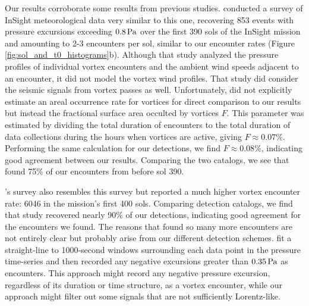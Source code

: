 \documentclass[linenumbers,trackchanges]{aastex63}
\begin{document}
Our results corroborate some results from previous studies. \citet{2021Icar..35514119L} conducted a survey of InSight meteorological data very similar to this one, recovering 853 events with pressure excursions exceeding $0.8\,{\rm Pa}$ over the first 390 sols of the InSight mission and amounting to 2-3 encounters per sol, similar to our encounter rates (Figure \ref{fig:sol_and_t0_histograms}b). Although that study analyzed the pressure profiles of individual vortex encounters and the ambient wind speeds adjacent to an encounter, it did not model the vortex wind profiles. That study did consider the seismic signals from vortex passes as well. Unfortunately, \citet{2021Icar..35514119L} did not explicitly estimate an areal occurrence rate for vortices for direct comparison to our results but instead the fractional surface area occulted by vortices $F$. This parameter was estimated by dividing the total duration of encounters to the total duration of data collections during the hours when vortices are active, giving $F \approx 0.07\%$. Performing the same calculation for our detections, we find $F \approx 0.08\%$, indicating good agreement between our results. Comparing the two catalogs, we see that \citet{2021Icar..35514119L} found 75\% of our encounters from before sol 390.


\citet{2021JGRE..12606511S}'s survey also resembles this survey but reported a much higher vortex encounter rate: 6046 in the mission's first 400 sols. Comparing detection catalogs, we find that study recovered nearly 90\% of our detections, indicating good agreement for the encounters we found. The reasons that \citet{2021JGRE..12606511S} found so many more encounters are not entirely clear but probably arise from our different detection schemes. \citet{2021JGRE..12606511S} fit a straight-line to 1000-second windows surrounding each data point in the pressure time-series and then recorded any negative excursions greater than $0.35\,{\rm Pa}$ as encounters. This approach might record any negative pressure excursion, regardless of its duration or time structure, as a vortex encounter, while our approach might filter out some signals that are not sufficiently Lorentz-like. 
\end{document}
